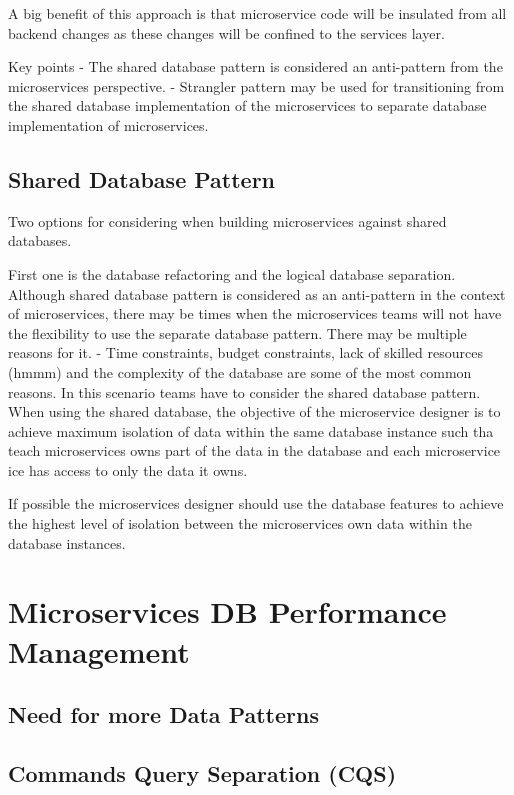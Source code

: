 A big benefit of this approach is that microservice code will be insulated from all backend changes as these changes will be confined to the services layer.

Key points
- The shared database pattern is considered an anti-pattern from the microservices perspective.
- Strangler pattern may be used for transitioning from the shared database implementation of the microservices to separate database implementation of microservices.

\section{Shared Database Pattern}
Two options for considering when building microservices against shared databases.

First one is the database refactoring and the logical database separation.
Although shared database pattern is considered as an anti-pattern in the context of microservices, there may be times when the microservices teams will not have the flexibility to use the separate database pattern.
There may be multiple reasons for it.
- Time constraints, budget constraints, lack of skilled resources (hmmm) and the complexity of the database are some of the most common reasons.
In this scenario teams have to consider the shared database pattern.
When using the shared database, the objective of the microservice designer is to achieve maximum isolation of data within the same database instance such tha teach microservices owns part of the data in the database and each microservice ice has access to only the data it owns.

If possible the microservices designer should use the database features to achieve the highest level of isolation between the microservices own data within the database instances.

\chapter{Microservices DB Performance Management}

\section{Need for more Data Patterns}

\section{Commands Query Separation (CQS)}

